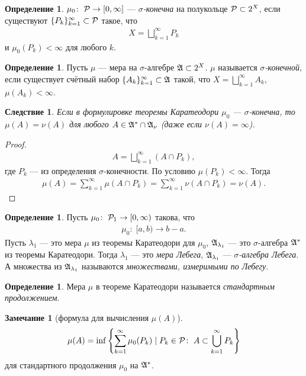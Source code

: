 \documentclass[a4paper,14pt]{extarticle}
\newcounter{theoremCnt}
\theoremstyle{definition}
\newtheorem{df}[theoremCnt]{Определение}
\theoremstyle{plain}
\theoremstyle{plain}
\theoremstyle{plain}
\newtheorem{crly}[theoremCnt]{Следствие}
\theoremstyle{plain}
\theoremstyle{definition}
\theoremstyle{definition}
\newtheorem{remrk}[theoremCnt]{Замечание}
\theoremstyle{definition}
\theoremstyle{definition}
\theoremstyle{definition}
\theoremstyle{definition}
\theoremstyle{plain}
\theoremstyle{plain}
\theoremstyle{plain}
\theoremstyle{plain}
\theoremstyle{definition}
\theoremstyle{definition}
\theoremstyle{definition}
\theoremstyle{definition}
\theoremstyle{definition}
\newcommand{\A}{\ensuremath \mathfrak{A}}
\newcommand{\p}{\ensuremath \mathcal{P}}
\begin{document}
\begin{df}
 $\mu_0 \colon\; \p \to [0, \infty]$ --- \textit{$\sigma$-конечна} на полукольце $\p \subset 2^{X}$, если существуют $\{P_k\}_{k=1}^{\infty} \subset \p $ такое, что
 \begin{align*}
  X = \bigsqcup_{k=1}^{\infty} P_k
 \end{align*} и $\mu_0(P_k) < \infty$ для любого $k$.
\end{df}
\begin{df}
 Пусть $\mu$ --- мера на $\sigma$-алгебре $\A \subset 2^{X}$. $\mu$ называется \textit{$\sigma$-конечной}, если существует счётный набор $\{A_k\}_{k=1}^{\infty} \subset \A $ такой, что $X = \bigsqcup_{k=1}^{\infty} A_k $, $\mu(A_k) < \infty$.
\end{df}
\begin{crly}
 Если в формулировке теоремы Каратеодори $\mu_0$ --- $\sigma$-конечна, то $\mu(A) = \nu(A)$ для любого $A \in \A^{\ast} \cap \A_{\nu}$ (даже если $\nu(A) = \infty$).
\end{crly}
\begin{proof}
 \begin{align*}
  A = \bigsqcup_{k=1}^{\infty} (A \cap P_k)
  ,\end{align*} где $P_k$ --- из определения $\sigma$-конечности. По условию  $\mu(P_k) < \infty$. Тогда
 \begin{align*}
  \mu(A) = \sum_{k=1}^{\infty} \mu(A \cap P_k) = \sum_{k=1}^{\infty} \nu(A \cap P_k) = \nu(A)
  .\end{align*}
\end{proof}
\begin{df}
 Пусть $\mu_0 \colon\; \p_1 \to [0, \infty)$ такова, что
 \begin{align*}
  \mu_0 \colon\; [a, b) \to b - a
  .\end{align*} Пусть $\lambda_1$ --- это мера  $\mu$ из теоремы Каратеодори для $\mu_0$, $\A_{\lambda_1}$ --- это $\sigma$-алгебра $\A^{\ast}$ из теоремы Каратеодори. Тогда $\lambda_1$ --- это \textit{мера Лебега}, $\A_{\lambda_1}$ --- \textit{$\sigma$-алгебра Лебега}. А множества из $\A_{\lambda_1}$ называются \textit{множествами, измеримыми по Лебегу}.
\end{df}
\begin{df}
 Мера $\mu$ в теореме Каратеодори называется \textit{стандартным продолжением}.
\end{df}
\begin{remrk}[формула для вычисления $\mu(A)$]
 \begin{align*}
  \mu(A) = \inf \left\{ \sum_{k=1}^{\infty} \mu_0(P_k) \mid P_k \in \p \colon\; A \subset \bigcup_{k=1}^{\infty} P_k \right\}
 \end{align*}
 для стандартного продолжения $\mu_{0}$ на $\A^{\ast}$.
\end{remrk}
\end{document}
